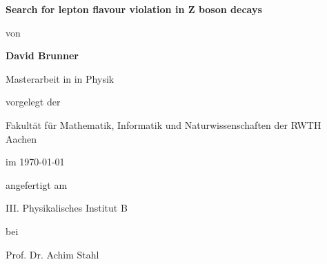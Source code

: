 \begin{titlepage}
    \begin{center}
        \vspace*{1cm}
        
        \Huge
        \textbf{Search for lepton flavour violation in Z boson decays}
        
        \vspace{0.5cm}
        
        \large
        
        von
        
        \vspace{0.5cm}
        
        \textbf{David Brunner}
        
        \vspace{4.0cm}
        
        Masterarbeit in in Physik
        
        \vspace{0.5cm}
        
        vorgelegt der 
        
        \vspace{0.5cm}
        
        Fakultät für Mathematik, Informatik und Naturwissenschaften der RWTH Aachen
        
        \vspace{0.5cm}
        
        im \today{}
        
        \vspace{0.5cm}
        
        angefertigt am
        
        \vspace{0.5cm}
        
        III. Physikalisches Institut B
        
        \vspace{0.5cm}
        
        bei 
        
        \vspace{0.5cm}
        
        Prof. Dr. Achim Stahl
    
    \end{center}
\end{titlepage}
